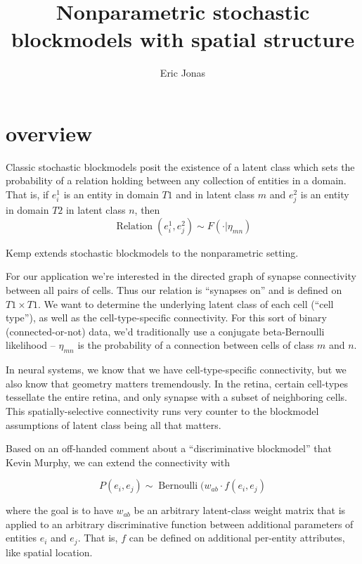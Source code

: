 \documentclass{article}
\begin{document}
\title{Nonparametric stochastic blockmodels with spatial structure}
\author{Eric Jonas}

\maketitle

\section{overview}

Classic stochastic blockmodels posit the existence of a latent class
which sets the probability of a relation holding between any
collection of entities in a domain. That is, if $e^1_i$ is an entity
in domain $T1$ and in latent class $m$ and $e^2_j$ is an entity in
domain $T2$ in latent class $n$, then 
\begin{equation}
\operatorname{Relation}(e^1_i, e^2_j) \sim F(\cdot | \eta_{mn})
\end{equation}

Kemp \parencite{Kemp2006a} extends stochastic blockmodels to the nonparametric setting. 

For our application we're interested in the directed graph of synapse
connectivity between all pairs of cells. Thus our relation is
``synapses on'' and is defined on $T1\times T1$. We want to determine
the underlying latent class of each cell (``cell type''), as well as
the cell-type-specific connectivity. For this sort of binary
(connected-or-not) data, we'd traditionally use a conjugate
beta-Bernoulli likelihood -- $\eta_{mn}$ is the probability of a
connection between cells of class $m$ and $n$.

In neural systems, we know that we have cell-type-specific
connectivity, but we also know that geometry matters tremendously. In
the retina, certain cell-types tessellate the entire retina, and only
synapse with a subset of neighboring cells. This spatially-selective
connectivity runs very counter to the blockmodel assumptions of latent class
being all that matters. 

Based on an off-handed comment about a ``discriminative blockmodel''
that Kevin Murphy, we can extend the connectivity with

\begin{equation}
P(e_i, e_j) \sim \operatorname{Bernoulli}(w_{ab}\cdot f(e_i, e_j)
\end{equation}

where the goal is to have $w_{ab}$ be an arbitrary latent-class weight
matrix that is applied to an arbitrary discriminative function between
additional parameters of entities $e_i$ and $e_j$. That is, $f$ can be
defined on additional per-entity attributes, like spatial location.
\end{document}
